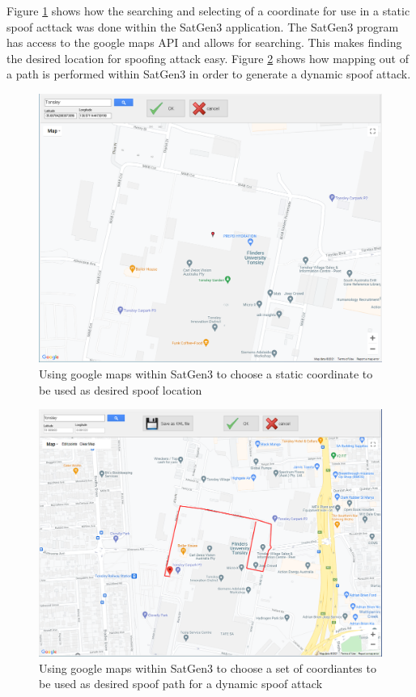 Figure \ref{fig:StaticCoordinate} shows how the searching and selecting of a coordinate for use in a static spoof acttack was done within the SatGen3 application. The
SatGen3 program has access to the google maps API and allows for searching. This makes finding the desired location for spoofing attack easy. 
Figure \ref{fig:DynamicCoordinate} shows how mapping out of a path is performed within SatGen3 in order to generate a dynamic spoof attack.

\begin{figure}
    \begin{centering}
        \includegraphics[width=12cm,keepaspectratio]{Figures/static coordinates setup.png}
        \caption{Using google maps within SatGen3 to choose a static coordinate to be used as desired spoof location}
    \label{fig:StaticCoordinate}
    \end{centering}
\end{figure}

\begin{figure}[ht]
    \begin{centering}
        \includegraphics[width=12cm,keepaspectratio]{Figures/dynamic coordinates setup.png}
        \caption{Using google maps within SatGen3 to choose a set of coordiantes to be used as desired spoof path for a dynamic spoof attack}
    \label{fig:DynamicCoordinate}
    \end{centering}
\end{figure}

